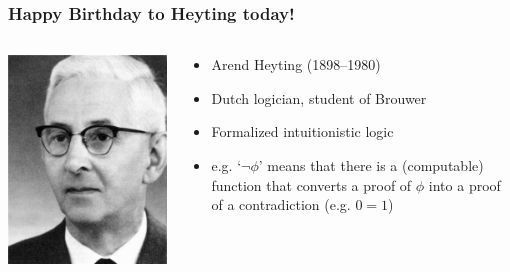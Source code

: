 \begin{frame}
  \frametitle{Happy Birthday to Heyting today!}

  \begin{columns}
    \begin{column}{.35\textwidth}
      \includegraphics[height=.6\textheight]{../assets/Heyting}
    \end{column}
    \begin{column}{.7\textwidth}
      \begin{itemize}[<+->]
        \item Arend Heyting (1898--1980)
                
        \item Dutch logician, student of Brouwer
        
        \item Formalized intuitionistic logic
        
        \item e.g. `$\neg \phi$' means that there is a (computable) function that converts a proof of $\phi$ into a proof of a contradiction (e.g. $0=1$)
        
     
      \end{itemize}
    \end{column}
  \end{columns}
\end{frame}


